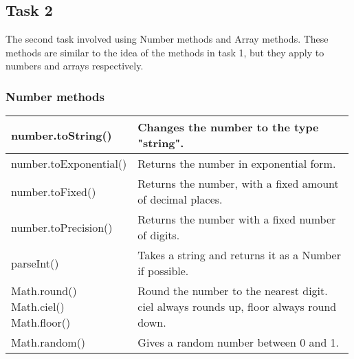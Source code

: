 \documentclass[portfolio.tex]{subfiles}
\begin{document}
			\subsection{Task 2}
				The second task involved using Number methods and Array methods. These methods are similar to the idea of the methods in task 1, but they apply to numbers and arrays respectively.\\

				\subsubsection{Number methods}

				\hspace{-0.5cm}
				\begin{tabular}{|P{0.33\linewidth}|p{0.66\linewidth}|}
					\hline
					number.toString() & Changes the number to the type "string".  \\
					\hline
					number.toExponential() & Returns the number in exponential form. \\
					\hline
					number.toFixed() & Returns the number, with a fixed amount of decimal places. \\
					\hline
					number.toPrecision() &  Returns the number with a fixed number of digits. \\
					\hline
					parseInt() & Takes a string and returns it as a Number if possible.   \\
					\hline
					Math.round() \newline Math.ciel() \newline Math.floor() &  Round the number to the nearest digit. ciel always rounds up, floor always round down. \\
					\hline
					Math.random() & Gives a random number between 0 and 1. \\
					\hline
				\end{tabular}
				\autocite{number-methods}\\
\end{document}
